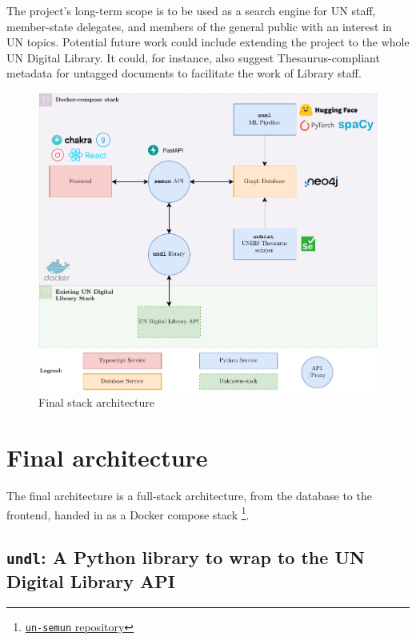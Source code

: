 \documentclass[11pt]{article}
\begin{document}
The project's long-term scope is to be used as a search engine for UN staff, member-state delegates, and members of the general public with an interest in UN topics. Potential future work could include extending the project to the whole UN Digital Library. It could, for instance, also suggest Thesaurus-compliant metadata for untagged documents to facilitate the work of Library staff.


\begin{figure}[!htb]
    \centering
    \includegraphics[width=\textwidth]{res/architecture-final.pdf}
    \caption{Final stack architecture}

    \label{fig:architecture}
\end{figure}

\section{Final architecture}

The final architecture is a full-stack architecture, from the database to the frontend, handed in as a Docker compose stack \footnote{\href{https://github.com/ClementSicard/un-semun}{\faGithub{} \texttt{un-semun} repository}}.

\subsection{\texttt{undl}: A Python library to wrap to the UN Digital Library API}
\end{document}
